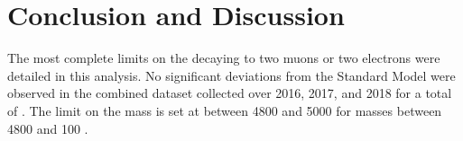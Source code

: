 \chapter{Conclusion and Discussion}
\label{ch:conclusion}
The most complete limits on the \WR decaying to two muons or two electrons were detailed in this analysis. No significant deviations from the Standard Model were observed in the combined \rootsthirteen dataset collected over 2016, 2017, and 2018 for a total of \GoodLumiNumber. The limit on the \WR mass is set at between 4800 and 5000 \GeV for \NR masses between 4800 and 100 \GeV.

